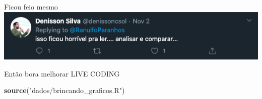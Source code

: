 \documentclass[
  9pt,
  ignorenonframetext,
]{beamer}
\newenvironment{Shaded}{\begin{snugshade}}{\end{snugshade}}
\newcommand{\KeywordTok}[1]{\textcolor[rgb]{0.13,0.29,0.53}{\textbf{#1}}}
\newcommand{\NormalTok}[1]{#1}
\newcommand{\StringTok}[1]{\textcolor[rgb]{0.31,0.60,0.02}{#1}}
\begin{document}
\begin{frame}{Ficou feio mesmo}
\protect\hypertarget{ficou-feio-mesmo}{}
\includegraphics{imgs/feio_mesmo.png}
\end{frame}

\begin{frame}[fragile]{Então bora melhorar}
\protect\hypertarget{entuxe3o-bora-melhorar}{}
LIVE CODING

\begin{Shaded}
\begin{Highlighting}[]
\KeywordTok{source}\NormalTok{(}\StringTok{"dados/brincando\_graficos.R"}\NormalTok{)}
\end{Highlighting}
\end{Shaded}
\end{frame}
\end{document}
